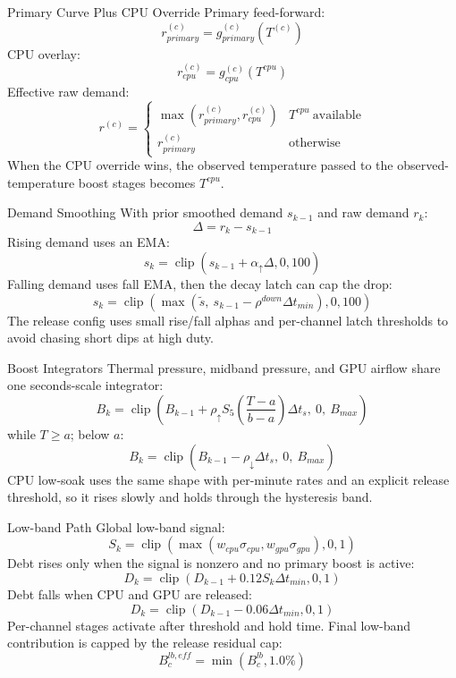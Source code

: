 \documentclass[aspectratio=169]{beamer}
\newcommand{\clip}{\operatorname{clip}}
\begin{document}
\begin{frame}{Primary Curve Plus CPU Override}
  Primary feed-forward:
  \[
    r^{(c)}_{primary}=g^{(c)}_{primary}\left(T^{(c)}\right)
  \]
  CPU overlay:
  \[
    r^{(c)}_{cpu}=g^{(c)}_{cpu}\left(T^{cpu}\right)
  \]
  Effective raw demand:
  \[
    r^{(c)} =
    \begin{cases}
      \max(r^{(c)}_{primary},r^{(c)}_{cpu}) & T^{cpu}\ \text{available} \\
      r^{(c)}_{primary} & \text{otherwise}
    \end{cases}
  \]
  When the CPU override wins, the observed temperature passed to the
  observed-temperature boost stages becomes $T^{cpu}$.
\end{frame}

\begin{frame}{Demand Smoothing}
  With prior smoothed demand $s_{k-1}$ and raw demand $r_k$:
  \[
    \Delta=r_k-s_{k-1}
  \]
  Rising demand uses an EMA:
  \[
    s_k=\clip(s_{k-1}+\alpha_{\uparrow}\Delta,0,100)
  \]
  Falling demand uses fall EMA, then the decay latch can cap the drop:
  \[
    s_k=\clip\left(\max(\tilde{s},\ s_{k-1}-
      \rho^{down}\Delta t_{min}),0,100\right)
  \]
  The release config uses small rise/fall alphas and per-channel latch
  thresholds to avoid chasing short dips at high duty.
\end{frame}

\begin{frame}{Boost Integrators}
  Thermal pressure, midband pressure, and GPU airflow share one
  seconds-scale integrator:
  \[
    B_k=\clip\left(B_{k-1}+\rho_{\uparrow}
      S_5\left(\frac{T-a}{b-a}\right)\Delta t_s,\ 0,\ B_{max}\right)
  \]
  while $T\ge a$; below $a$:
  \[
    B_k=\clip(B_{k-1}-\rho_{\downarrow}\Delta t_s,\ 0,\ B_{max})
  \]
  CPU low-soak uses the same shape with per-minute rates and an explicit
  release threshold, so it rises slowly and holds through the hysteresis band.
\end{frame}

\begin{frame}{Low-band Path}
  Global low-band signal:
  \[
    S_k=\clip(\max(w_{cpu}\sigma_{cpu},w_{gpu}\sigma_{gpu}),0,1)
  \]
  Debt rises only when the signal is nonzero and no primary boost is active:
  \[
    D_k=\clip(D_{k-1}+0.12 S_k \Delta t_{min},0,1)
  \]
  Debt falls when CPU and GPU are released:
  \[
    D_k=\clip(D_{k-1}-0.06 \Delta t_{min},0,1)
  \]
  Per-channel stages activate after threshold and hold time. Final low-band
  contribution is capped by the release residual cap:
  \[
    B^{lb,eff}_c=\min(B^{lb}_c,1.0\%)
  \]
\end{frame}
\end{document}
